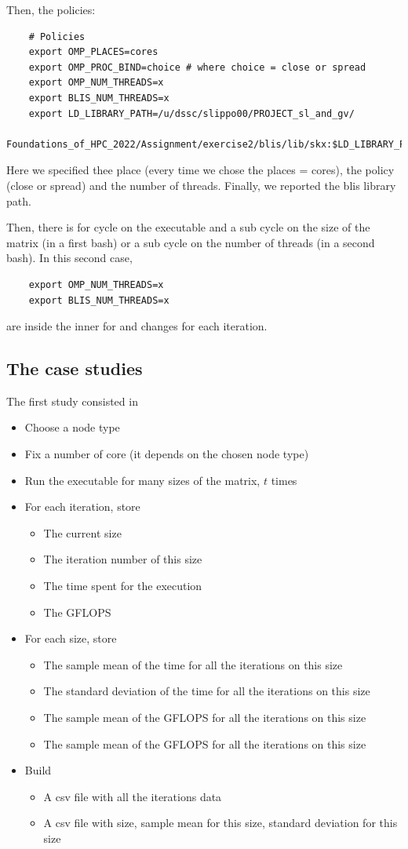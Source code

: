 \documentclass[12pt, titlepage]{report}
\begin{document}
Then, the policies:
\begin{verbatim}
    # Policies
    export OMP_PLACES=cores
    export OMP_PROC_BIND=choice # where choice = close or spread
    export OMP_NUM_THREADS=x
    export BLIS_NUM_THREADS=x
    export LD_LIBRARY_PATH=/u/dssc/slippo00/PROJECT_sl_and_gv/
		Foundations_of_HPC_2022/Assignment/exercise2/blis/lib/skx:$LD_LIBRARY_PATH
\end{verbatim}
Here we specified thee place (every time we chose the places = cores), the policy (close or spread) and the number of threads. Finally, we reported the blis library path.

Then, there is for cycle on the executable and a sub cycle on the size of the matrix (in a first bash) or a sub cycle on the number of threads (in a second bash). In this second case, 
\begin{verbatim}
    export OMP_NUM_THREADS=x
    export BLIS_NUM_THREADS=x
\end{verbatim}
are inside the inner for and changes for each iteration. 

\subsection{The case studies}
The first study consisted in 
\begin{itemize}
    \item Choose a node type
    \item Fix a number of core (it depends on the chosen node type)
    \item Run the executable for many sizes of the matrix, $t$ times 
    \item For each iteration, store
    \begin{itemize}
        \item The current size 
        \item The iteration number of this size
        \item The time spent for the execution
        \item The GFLOPS
    \end{itemize}
    \item For each size, store
        \begin{itemize}
            \item The sample mean of the time for all the iterations on this size
            \item The standard deviation of the time for all the iterations on this size
            \item The sample mean of the GFLOPS for all the iterations on this size
            \item The sample mean of the GFLOPS for all the iterations on this size
        \end{itemize}
    \item Build
    \begin{itemize}
        \item A csv file with all the iterations data 
        \item A csv file with size, sample mean for this size, standard deviation for this size 
    \end{itemize}
\end{itemize}
\end{document}
